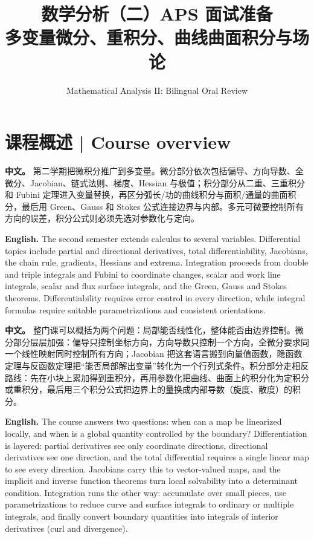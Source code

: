 \documentclass[UTF8,11pt,a4paper]{ctexart}
\title{数学分析（二）APS 面试准备\\[4pt]\large 多变量微分、重积分、曲线曲面积分与场论}
\author{Mathematical Analysis II: Bilingual Oral Review}
\date{}
\newcommand{\APS}[2]{\par\noindent\textbf{中文。} #1\par\noindent\textbf{English.} #2\par\smallskip}
\begin{document}
\maketitle

\section*{课程概述 | Course overview}
\APS{第二学期把微积分推广到多变量。微分部分依次包括偏导、方向导数、全微分、Jacobian、链式法则、梯度、Hessian 与极值；积分部分从二重、三重积分和 Fubini 定理进入变量替换，再区分弧长/功的曲线积分与面积/通量的曲面积分，最后用 Green、Gauss 和 Stokes 公式连接边界与内部。多元可微要控制所有方向的误差，积分公式则必须先选对参数化与定向。}{The second semester extends calculus to several variables. Differential topics include partial and directional derivatives, total differentiability, Jacobians, the chain rule, gradients, Hessians and extrema. Integration proceeds from double and triple integrals and Fubini to coordinate changes, scalar and work line integrals, scalar and flux surface integrals, and the Green, Gauss and Stokes theorems. Differentiability requires error control in every direction, while integral formulas require suitable parametrizations and consistent orientations.}
\APS{整门课可以概括为两个问题：局部能否线性化，整体能否由边界控制。微分部分层层加强：偏导只控制坐标方向，方向导数只控制一个方向，全微分要求同一个线性映射同时控制所有方向；Jacobian 把这套语言搬到向量值函数，隐函数定理与反函数定理把“能否局部解出变量”转化为一个行列式条件。积分部分走相反路线：先在小块上累加得到重积分，再用参数化把曲线、曲面上的积分化为定积分或重积分，最后用三个积分公式把边界上的量换成内部导数（旋度、散度）的积分。}{The course answers two questions: when can a map be linearized locally, and when is a global quantity controlled by the boundary? Differentiation is layered: partial derivatives see only coordinate directions, directional derivatives see one direction, and the total differential requires a single linear map to see every direction. Jacobians carry this to vector-valued maps, and the implicit and inverse function theorems turn local solvability into a determinant condition. Integration runs the other way: accumulate over small pieces, use parametrizations to reduce curve and surface integrals to ordinary or multiple integrals, and finally convert boundary quantities into integrals of interior derivatives (curl and divergence).}
\end{document}
